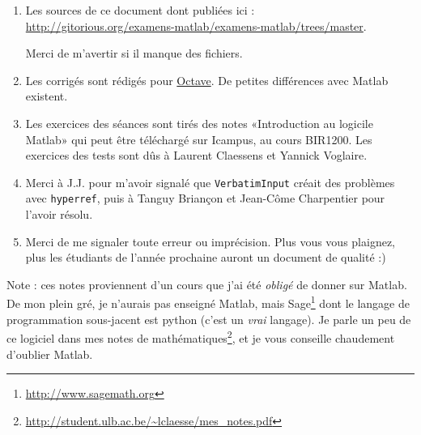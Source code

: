 \begin{enumerate}

	\item
		Les sources de ce document dont publiées ici : \\\url{http://gitorious.org/examens-matlab/examens-matlab/trees/master}.
		
		Merci de m'avertir si il manque des fichiers.
	\item
		Les corrigés sont rédigés pour \href{http://qtoctave.wordpress.com/}{Octave}. De petites différences avec Matlab existent.
	\item
		Les exercices des séances sont tirés des notes «Introduction au logicile Matlab» qui peut être téléchargé sur Icampus, au cours BIR1200.  Les exercices des tests sont dûs à Laurent Claessens et Yannick Voglaire.
    \item
        Merci à J.J. pour m'avoir signalé que \texttt{VerbatimInput} créait des problèmes avec \texttt{hyperref}, puis à Tanguy Briançon et Jean-Côme Charpentier pour l'avoir résolu.
	\item
		Merci de me signaler toute erreur ou imprécision. Plus vous vous plaignez, plus les étudiants de l'année prochaine auront un document de qualité :)
\end{enumerate}

Note : ces notes proviennent d'un cours que j'ai été \emph{obligé} de donner sur Matlab. De mon plein gré, je n'aurais pas enseigné Matlab, mais Sage\footnote{\url{http://www.sagemath.org}} dont le langage de programmation sous-jacent est python (c'est un \emph{vrai} langage). Je parle un peu de ce logiciel dans mes notes de mathématiques\footnote{\url{http://student.ulb.ac.be/~lclaesse/mes_notes.pdf}}, et je vous conseille chaudement d'oublier Matlab.
